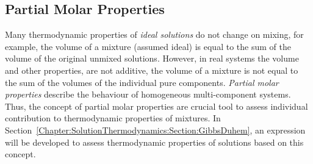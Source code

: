 \subsection{Partial Molar Properties}\label{Chapter:VLE:Section:PartialMolarProperties}
Many thermodynamic properties of {\it ideal solutions} do not change on mixing, for example, the volume of a mixture (assumed ideal) is equal to the sum of the volume of the original unmixed solutions. However, in real systems the volume and other properties, are not additive, \ie the volume of a mixture is not equal to the sum of the volumes of the individual pure components. {\it Partial molar properties} describe the behaviour of homogeneous multi-component systems. Thus, the concept of partial molar properties are crucial tool to assess individual contribution to thermodynamic properties of mixtures. In Section~\ref{Chapter:SolutionThermodynamics:Section:GibbsDuhem}, an expression will be developed to assess thermodynamic properties of solutions based on this concept. 

